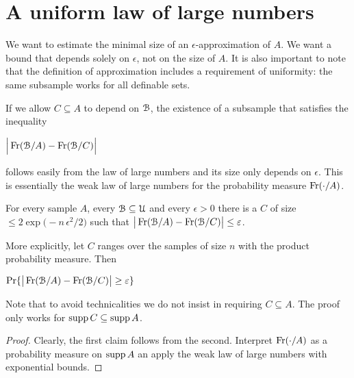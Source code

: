 \documentclass[sputnik.tex]{subfiles}
\begin{document}
\section{A uniform law of large numbers}

\def\ceq#1#2#3{\parbox[t]{35ex}{$\displaystyle #1$}\medrel{#2}{$\displaystyle #3$}}

We want to estimate the minimal size of an $\epsilon$-approximation of $A$.
We want a bound that depends solely on $\epsilon$, not on the size of $A$.
It is also important to note that the definition of approximation includes a requirement of uniformity: the same subsample works for all definable sets.

If we allow $C\subseteq A$ to depend on $\EuScript B$, the existence of a subsample that satisfies the inequality 

\ceq{\hfill\displaystyle \Big|\Fr(\B/A) - \Fr(\B/C)\Big|}{\le}{\epsilon}

follows easily from the law of large numbers and its size only depends on $\epsilon$. This is essentially the weak law of large numbers for the probability measure $\mathop{\rm Fr}(\cdot/A)$.

\def\ceq#1#2#3{\parbox[t]{35ex}{$\displaystyle #1$}\medrel{#2}{$\displaystyle #3$}}

\begin{proposition}
For every sample $A$, every $\EuScript B\subseteq\EuScript U$ and every $\epsilon>0$ there is a $C$ of size $\le2\exp\big(-n\,\epsilon^2/2\big)$ such that $\big|\mathop{\rm Fr}(\EuScript B/A) - \mathop{\rm Fr}(\EuScript B/C)\big|\le\varepsilon$.

More explicitly, let $C$ ranges over the samples of size $n$ with the product probability measure. Then 

\ceq{\hfill\Pr\{\big|\Fr(\B/A) - \Fr(\B/C)\big|\ge\epsilon\}}{\le}{{2\exp\Big(-\frac{n\epsilon^{\scriptscriptstyle 2}}{2}\Big)}}
\end{proposition}
% 
% 
% 

Note that to avoid technicalities we do not insist in requiring $C\subseteq A$. The proof only works for $\mathop{\rm supp} C\subseteq\mathop{\rm supp} A$.

\begin{proof}
Clearly, the first claim follows from the second.
Interpret $\mathop{\rm Fr}(\cdot/A)$ as a probability measure on $\mathop{\rm supp} A$ an apply the weak law of large numbers with exponential bounds.
\end{proof}
\end{document}
